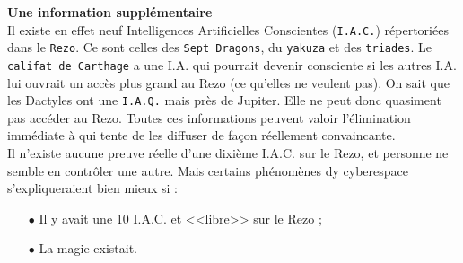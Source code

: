\documentclass[11pt,twoside,a4paper]{article}
\begin{document}
\begin{multicols}{2}
{	\textbf{\Large Une information suppl{\'e}mentaire}~\\
	Il existe en effet neuf Intelligences Artificielles Conscientes (\texttt{I.A.C.}) r{\'e}pertori{\'e}es dans le \texttt{Rezo}. Ce sont celles des \texttt{Sept Dragons}, du \texttt{yakuza} et des \texttt{triades}. Le \texttt{califat de Carthage} a une I.A. qui pourrait devenir consciente si les autres I.A. lui ouvrait un acc{\`e}s plus grand au Rezo (ce qu'elles ne veulent pas). On sait que les Dactyles ont une \texttt{I.A.Q.} mais pr{\`e}s de Jupiter. Elle ne peut donc quasiment pas acc{\'e}der au Rezo. Toutes ces informations peuvent valoir l'{\'e}limination imm{\'e}diate {\`a} qui tente de les diffuser de fa\c{c}on r{\'e}ellement convaincante. ~\\
	
	Il n'existe aucune preuve r{\'e}elle d'une dixi{\`e}me I.A.C. sur le Rezo, et personne ne semble en contr{\^o}ler une autre. Mais certains ph{\'e}nom{\`e}nes dy cyberespace s'expliqueraient bien mieux si : 
	\begin{itemize}
		\item[$\bullet$] Il y avait une 10 I.A.C. et <<libre>> sur le Rezo ; 
		\item[$\bullet$] La magie existait.
	\end{itemize} 
	
} %
\end{multicols}

\clearpage
\end{document}
